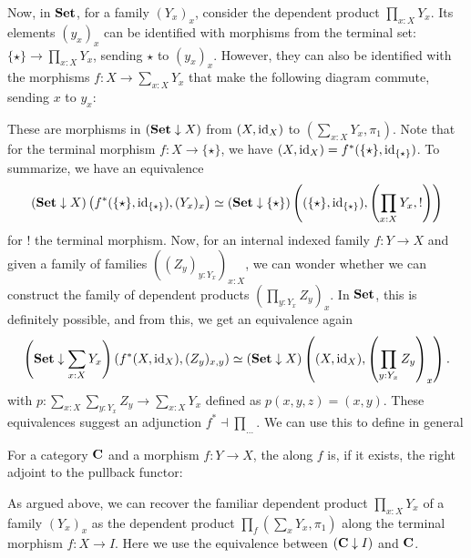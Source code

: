 Now, in $ \mathbf{Set} $, for a family $ (Y_x)_x $, consider the dependent product $ \prod_{x : X} Y_x $. Its elements $ (y_x)_x $ can be identified with morphisms from the terminal set: $ \{ \star \} \to \prod_{x : X} Y_x $, sending $ \star $ to $ (y_x)_x $. However, they can also be identified with the morphisms $ f: X \to \sum_{x : X} Y_x $ that make the following diagram commute, sending $ x $ to $ y_x $:
\begin{center}
\end{center}
These are morphisms in $ (\mathbf{Set} \downarrow X) $ from $ (X, \text{id}_{X}) $ to $ (\sum_{x : X} Y_x, \pi_1) $. Note that for the terminal morphism $ f: X \to \{ \star \} $, we have $ (X, \text{id}_{X}) = f^*(\{\star\}, \text{id}_{\{\star\}}) $. To summarize, we have an equivalence
\[ (\mathbf{Set} \downarrow X)\left(f^*(\{ \star \}, \text{id}_{\{\star\}}), (Y_x)_x \right) \simeq (\mathbf{Set} \downarrow {\{\star\}})\left( (\{\star\}, \text{id}_{\{ \star \}}), \left( \prod_{x : X} Y_x, ! \right) \right) \]
for $ ! $ the terminal morphism. Now, for an internal indexed family $ f : Y \to X $ and given a family of families $ ((Z_y)_{y : Y_x})_{x : X} $, we can wonder whether we can construct the family of dependent products $ (\prod_{y : Y_x} Z_y)_x $. In $ \mathbf{Set} $, this is definitely possible, and from this, we get an equivalence again
\[ \left(\mathbf{Set} \downarrow \sum_{x : X} Y_x \right)\left(f^*(X, \text{id}_{X}), (Z_y)_{x, y} \right) \simeq (\mathbf{Set} \downarrow X)\left((X, \text{id}_{X}), \left(\prod_{y : Y_x} Z_y\right)_x\right). \]
with $ p : \sum_{x : X} \sum_{y : Y_x} Z_y \to \sum_{x : X} Y_x $ defined as $ p(x, y, z) = (x, y) $. These equivalences suggest an adjunction $ f^* \dashv \prod_{\dots} $. We can use this to define in general
\begin{definition}
  For a category $ \mathbf{C} $ and a morphism $ f: Y \to X $, the  along $ f $ is, if it exists, the right adjoint to the pullback functor:
  \begin{center}
  \end{center}
\end{definition}
\begin{remark}
  As argued above, we can recover the familiar dependent product $ \prod_{x : X} Y_x $ of a family $ (Y_x)_x $ as the dependent product $ \prod_f (\sum_x Y_x, \pi_1) $ along the terminal morphism $ f: X \to I $. Here we use the equivalence between $ (\mathbf{C} \downarrow I) $ and $ \mathbf{C} $.
\end{remark}

